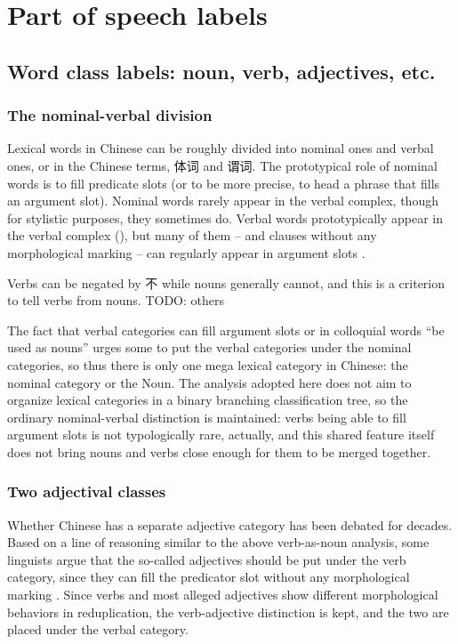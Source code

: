 \documentclass[UTF8, a4paper, oneside, scheme=plain, 12pt]{ctexrep}
\newcommand*{\citesec}[1]{\S~{#1}}
\begin{document}
\section{Part of speech labels}

\subsection{Word class labels: noun, verb, adjectives, etc.}

\subsubsection{The nominal-verbal division}

Lexical words in Chinese can be roughly divided into nominal ones and verbal ones,
or in the Chinese terms, 体词 and 谓词.
The prototypical role of nominal words 
is to fill predicate slots (or to be more precise, to head a phrase that fills an argument slot).
Nominal words rarely appear in the verbal complex,
though for stylistic purposes, they sometimes do.
Verbal words prototypically appear in the verbal complex
(),
but many of them -- and clauses without any morphological marking -- 
can regularly appear in argument slots \citep[\citesec{3.5}]{zhudexigrammar}.

Verbs can be negated by 不 while nouns generally cannot, 
and this is a criterion to tell verbs from nouns. TODO: others

The fact that verbal categories can fill argument slots or in colloquial words ``be used as nouns''
urges some to put the verbal categories under the nominal categories,
so thus there is only one mega lexical category in Chinese:
the nominal category or the Noun.
The analysis adopted here does not aim to organize lexical categories 
in a binary branching classification tree,
so the ordinary nominal-verbal distinction is maintained:
verbs being able to fill argument slots is not typologically rare, actually,
and this shared feature itself does not bring nouns and verbs close enough 
for them to be merged together.

\subsubsection{Two adjectival classes}

Whether Chinese has a separate adjective category 
has been debated for decades.
Based on a line of reasoning similar to the above verb-as-noun analysis,
some linguists argue that the so-called adjectives should be put under the verb category,
since they can fill the predicator slot without any morphological marking \citep{li1989mandarin}.
Since verbs and most alleged adjectives show different morphological behaviors in reduplication, %
the verb-adjective distinction is kept,
and the two are placed under the verbal category.
\end{document}
